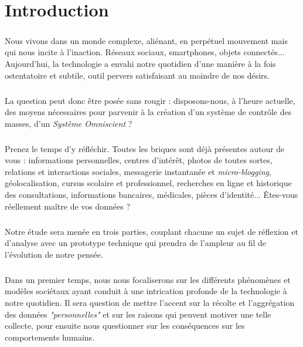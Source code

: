 \chapter{Introduction}

\paragraph{} Nous vivons dans un monde complexe, aliénant, en perpétuel mouvement mais qui
nous incite à l'inaction. Réseaux sociaux, smartphones, objets connectés... Aujourd'hui, la
technologie a envahi notre quotidien d'une manière à la fois ostentatoire et subtile, outil
pervers satisfaisant au moindre de nos désirs.

\paragraph{} La question peut donc être posée sans rougir : disposons-nous, à l'heure
actuelle, des moyens nécessaires pour parvenir à la création d'un système de contrôle des
masses, d'un \emph{Système Omniscient} ?

\paragraph{} Prenez le temps d'y réfléchir. Toutes les briques sont déjà présentes autour
de vous : informations personnelles, centres d'intérêt, photos de toutes sortes, relations
et interactions sociales, messagerie instantanée et \emph{micro-blogging}, géolocalisation,
cursus scolaire et professionnel, recherches en ligne et historique des consultations,
informations bancaires, médicales, pièces d'identité... Êtes-vous réellement maître de vos
données ?

\paragraph{} Notre étude sera menée en trois parties, couplant chacune un sujet de réflexion
et d'analyse avec un prototype technique qui prendra de l'ampleur au fil de l'évolution de
notre pensée.

\paragraph{} Dans un premier temps, nous nous focaliserons sur les différents phénomènes
et modèles sociétaux ayant conduit à une intrication profonde de la technologie à notre
quotidien. Il sera question de mettre l'accent sur la récolte et l'aggrégation des données
\emph{"personnelles"} et sur les raisons qui peuvent motiver une telle collecte, pour ensuite
nous questionner sur les conséquences sur les comportements humains.

